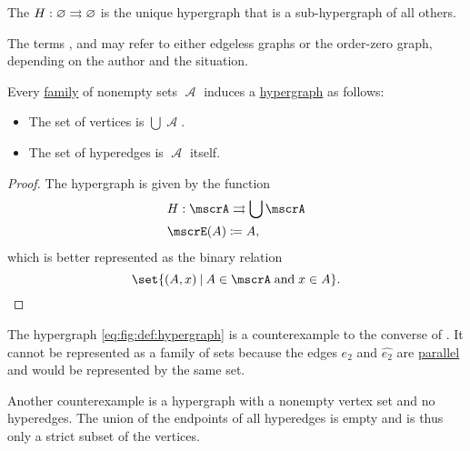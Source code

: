 \begin{definition}
\begin{thmenum}
    The  \( H: \varnothing \rightrightarrows \varnothing \) is the unique hypergraph that is a sub-hypergraph of all others.

    The terms ,  and  may refer to either edgeless graphs or the order-zero graph, depending on the author and the situation.
  \end{thmenum}
\end{definition}

\begin{proposition}\label{thm:family_of_sets_induces_hypergraph}
  Every \hyperref[rem:family_of_sets]{family} of nonempty sets \( \mscrA \) induces a \hyperref[def:hypergraph]{hypergraph} as follows:
  \begin{itemize}
    \item The set of vertices is \( \bigcup \mscrA \).
    \item The set of hyperedges is \( \mscrA \) itself.
  \end{itemize}
\end{proposition}
\begin{proof}
  The hypergraph is given by the function
  \begin{equation*}
    \begin{aligned}
      &H: \mscrA \multto \bigcup \mscrA \\
      &\mscrE(A) \coloneqq A,
    \end{aligned}
  \end{equation*}
  which is better represented as the binary relation
  \begin{equation*}
    \set{ (A, x) \given A \in \mscrA \T{and} x \in A }.
  \end{equation*}
\end{proof}

\begin{example}\label{ex:hypergraphs_not_induced_by_family}
  The hypergraph \eqref{eq:fig:def:hypergraph} is a counterexample to the converse of . It cannot be represented as a family of sets because the edges \( e_2 \) and \( \widehat{e_2} \) are \hyperref[def:hypergraph/parallel_hyperedges]{parallel} and would be represented by the same set.

  Another counterexample is a hypergraph with a nonempty vertex set and no hyperedges. The union of the endpoints of all hyperedges is empty and is thus only a strict subset of the vertices.
\end{example}

